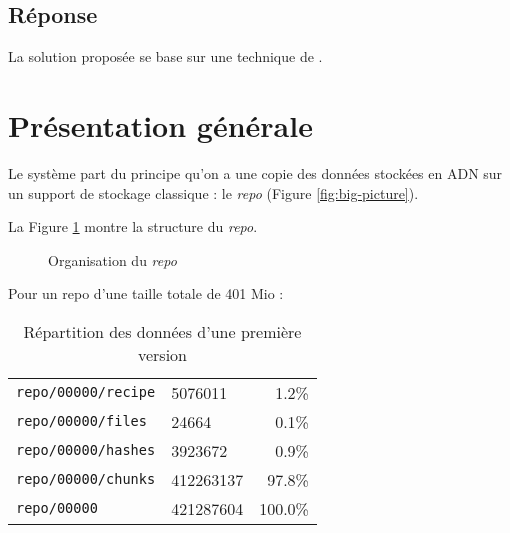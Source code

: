 \documentclass[a4paper,twocolumn]{article}
\begin{document}
\subsection{Réponse}



La solution proposée se base sur une technique de  \cite{shilane2012wan}.

\section{Présentation générale}


Le système part du principe qu'on a une copie des données stockées en
ADN sur un support de stockage classique : le \emph{repo} (Figure \ref{fig:big-picture}).
\begin{figure*}[ht]
\centering


\caption{Schéma global}
\label{fig:big-picture}
\end{figure*}

La Figure \ref{fig:repo-dir-tree} montre la structure du \emph{repo}. 

\begin{figure}
\caption{Organisation du \emph{repo}}
\label{fig:repo-dir-tree}
\end{figure}

Pour un repo d'une taille totale de 401 Mio :

\begin{table}
\begin{tabular}{l l r}
\verb|repo/00000/recipe| &   5076011 &   1.2\% \\
\verb|repo/00000/files| &      24664 &   0.1\% \\
\verb|repo/00000/hashes| &   3923672 &   0.9\% \\
\verb|repo/00000/chunks| & 412263137 &  97.8\% \\
\verb|repo/00000| &        421287604 & 100.0\% \\
\end{tabular}
\caption{Répartition des données d'une première version}
\label{fig:repo-data-distribution}
\end{table}
\end{document}
